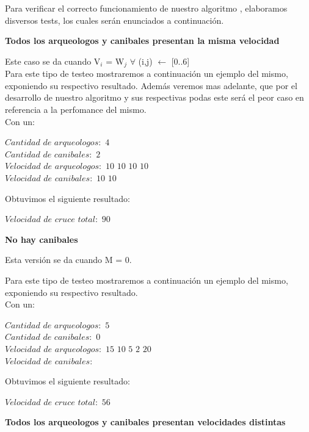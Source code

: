 \indent Para verificar el correcto funcionamiento de nuestro algoritmo , elaboramos disversos tests,
los cuales ser\'an enunciados a continuaci\'on.\\

\begin{center}
 \textbf{Todos los arqueologos y canibales presentan la misma velocidad}
\end{center}

Este caso se da cuando V$_{i}$ = W$_{j}$ $\forall$ (i,j)  $\gets$ [0..6] \\

 Para este tipo de testeo mostraremos a continuaci\'on un ejemplo del mismo, exponiendo su respectivo resultado. Adem\'as veremos mas adelante, que por el desarrollo de nuestro algoritmo y sus respectivas podas este ser\'a el peor caso en referencia a la perfomance del mismo.\\
 
 Con un:
\begin{flushleft}
	$Cantidad$ $de$ $arqueologos:$ $4 $  \\
	$Cantidad$ $de$ $canibales:$ $2 $  \\
	$Velocidad$ $de$ $arqueologos:$ $10$ $10$ $10$ $10$  \\
	$Velocidad$ $de$ $canibales:$ $10$ $10 $  \\
 \end{flushleft}	
  Obtuvimos el siguiente resultado:
\begin{flushleft}  
  $Velocidad$ $de$ $cruce$ $total: $ $90$\\
 \end{flushleft}


 \begin{center}
 \textbf{No hay canibales}
\end{center}

Esta versi\'on se da cuando M = 0. 

Para este tipo de testeo mostraremos a continuaci\'on un ejemplo del mismo, exponiendo su respectivo resultado.\\

 Con un:
 \begin{flushleft}
  	$Cantidad$ $de$ $arqueologos:$ $5 $  \\
	$Cantidad$ $de$ $canibales:$ $0 $  \\
	$Velocidad$ $de$ $arqueologos:$ $15$ $10$ $5$ $2$ $20$  \\
	$Velocidad$ $de$ $canibales: $  \\
\end{flushleft}
  Obtuvimos el siguiente resultado:
  \begin{flushleft}
$Velocidad$ $de$ $cruce$ $total: $ $56$\\
\end{flushleft}
\begin{center}
 \textbf{Todos los arqueologos y canibales presentan velocidades distintas}
\end{center}

